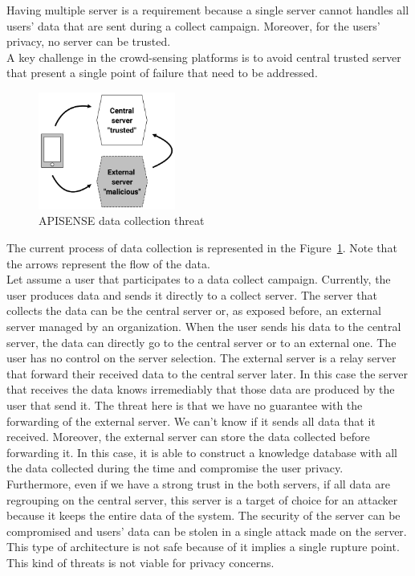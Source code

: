 Having multiple server is a requirement because a single server cannot handles all users' data that are sent during a collect campaign.
Moreover, for the users' privacy, no server can be trusted.
\\

A key challenge in the crowd-sensing platforms is to avoid central trusted server that present a single point of failure that need to be addressed.

\begin{figure}[h]
    \centering
    \includegraphics[width=0.4\textwidth]{figures/threat}
    \caption{\label{Threat} APISENSE data collection threat}
\end{figure}

The current process of data collection is represented in the Figure~\ref{Threat}.
Note that the arrows represent the flow of the data.
\\

Let assume a user that participates to a data collect campaign.
Currently, the user produces data and sends it directly to a collect server.
The server that collects the data can be the central server or, as exposed before, an external server managed by an organization.
When the user sends his data to the central server, the data can directly go to the central server or to an external one.
The user has no control on the server selection.
The external server is a relay server that forward their received data to the central server later.
In this case the server that receives the data knows irremediably that those data are produced by the user that send it.
The threat here is that we have no guarantee with the forwarding of the external server.
We can't know if it sends all data that it received.
Moreover, the external server can store the data collected before forwarding it.
In this case, it is able to construct a knowledge database with all the data collected during the time and compromise the user privacy.
Furthermore, even if we have a strong trust in the both servers, if all data are regrouping on the central server, this server is a target of choice for an attacker because it keeps the entire data of the system.
The security of the server can be compromised and users' data can be stolen in a single attack made on the server.
This type of architecture is not safe because of it implies a single rupture point.
This kind of threats is not viable for privacy concerns.
\\

